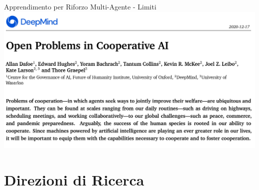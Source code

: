 \documentclass[presentation, 10pt,aspectratio=169]{beamer}\mode<presentation>{\usetheme{AMSBolognaFC}}
\begin{document}
\begin{frame}{Apprendimento per Riforzo Multi-Agente - Limiti}
	\includegraphics[width=\textwidth]{img/cooperative-ai.png}
\end{frame}

\section{Direzioni di Ricerca}
\end{document}
